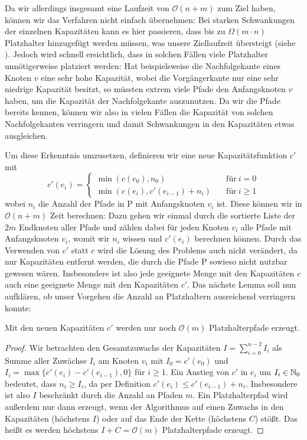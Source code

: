 Da wir allerdings insgesamt eine Laufzeit von $\mathcal O(n+m)$ zum Ziel haben, können wir das  Verfahren
nicht einfach übernehmen:
Bei starken Schwankungen der einzelnen Kapazitäten kann es hier passieren, dass bis zu $\Omega(m\cdot n)$
Platzhalter hinzugefügt werden müssen, was unsere Ziellaufzeit übersteigt (siehe ).
Jedoch wird schnell ersichtlich, dass in solchen Fällen viele Platzhalter unnötigerweise platziert werden:
Hat beispielsweise die Nachfolgekante eines Knoten $v$ eine sehr hohe Kapazität, wobei die Vorgängerkante nur eine sehr
niedrige Kapazität besitzt, so müssten extrem viele Pfade den Anfangsknoten $v$ haben, um die Kapazität der
Nachfolgekante auszunutzen.
Da wir die Pfade bereits kennen, können wir also in vielen Fällen die Kapazität von solchen Nachfolgekanten verringern und
damit Schwankungen in den Kapazitäten etwas ausgleichen.

Um diese Erkenntnis umzusetzen, definieren wir eine neue Kapazitätsfunktion $c'$ mit
\[
	c'(e_i) =
	\begin{cases}
		\min(c(e_0), n_0) &\quad\text{für}\ i=0\\
		\min(c(e_i), c'(e_{i-1}) + n_i) &\quad\text{für}\ i \geq 1
	\end{cases}
\]
wobei $n_i$ die Anzahl der Pfade in P mit Anfangsknoten $v_i$ ist.
Diese können wir in $\mathcal O(n+m)$ Zeit berechnen: Dazu gehen wir einmal durch die sortierte Liste der $2m$ Endknoten
aller Pfade und zählen dabei für jeden Knoten $v_i$ alle Pfade mit Anfangsknoten $v_i$, womit wir $n_i$ wissen und
$c'(e_i)$ berechnen können.
Durch das Verwenden von $c'$ statt $c$ wird die Lösung des Problems auch nicht verändert, da nur Kapazitäten entfernt
werden, die durch die Pfade P sowieso nicht nutzbar gewesen wären.
Insbesondere ist also jede geeignete Menge mit den Kapazitäten $c$ auch eine geeignete Menge mit den Kapazitäten $c'$.
Das nächste Lemma soll nun aufklären, ob unser Vorgehen die Anzahl an Platzhaltern ausreichend verringern konnte:

\begin{lemma}
    Mit den neuen Kapazitäten $c'$ werden nur noch $\mathcal O(m)$ Platzhalterpfade erzeugt.
\end{lemma}
\begin{proof}
    Wir betrachten den Gesamtzuwachs der Kapazitäten $I = \sum_{i = 0}^{n-2} I_i$ als Summe aller Zuwächse $I_i$ am
    Knoten $v_i$ mit $I_0 = c'(e_0)$ und $I_i = \max\{c'(e_i) - c'(e_{i-1}), 0\}$ für $i \geq 1$.
    Ein Anstieg von $c'$ in $e_i$ um $I_i \in \mathbb N_0$ bedeutet, dass $n_i \geq I_i$, da per Definition
    $c'(e_i) \leq c'(e_{i-1}) + n_i$.
    Insbesondere ist also $I$ beschränkt durch die Anzahl an Pfaden $m$.
    Ein Platzhalterpfad wird außerdem nur dann erzeugt, wenn der Algorithmus auf einen Zuwachs in den Kapazitäten (höchstens $I$)
    oder auf das Ende der Kette (höchstens $C$) stößt.
    Das heißt es werden höchstens $I + C = \mathcal O(m)$ Platzhalterpfade erzeugt.
\end{proof}

